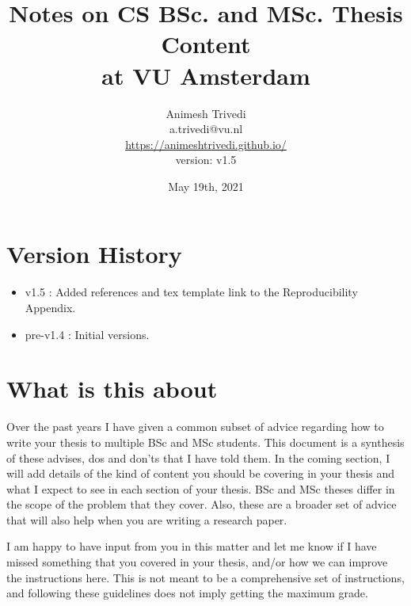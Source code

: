 \documentclass{article}
\title{Notes on CS BSc. and MSc.\textbf{} Thesis Content \\ at VU Amsterdam \bigskip}
\author{Animesh Trivedi \\ a.trivedi@vu.nl \\ \url{https://animeshtrivedi.github.io/} \\ version: v1.5}
\date{May 19th, 2021}
\begin{document}
\maketitle
\newpage
\tableofcontents
\newpage 
\section*{Version History}
\begin{itemize}
    \item v1.5     : Added references and tex template link to the Reproducibility Appendix. 
    \item pre-v1.4 : Initial versions. 
\end{itemize}

\newpage 
\section*{What is this about}
Over the past years I have given a common subset of advice regarding how to write your thesis to multiple BSc and MSc students. This document is a synthesis of these advises, dos and don'ts that I have told them. In the coming section, I will add details of the kind of content you should be covering in your thesis and what I expect to see in each section of your thesis. BSc and MSc theses differ in the scope of the problem that they cover. Also, these are a broader set of advice that will also help when you are writing a research paper. 


I am happy to have input from you in this matter and let me know if I have missed something that you covered in your thesis, and/or how we can improve the instructions here. This is not meant to be a comprehensive set of instructions, and following these guidelines does not imply getting the maximum grade. 
\end{document}
